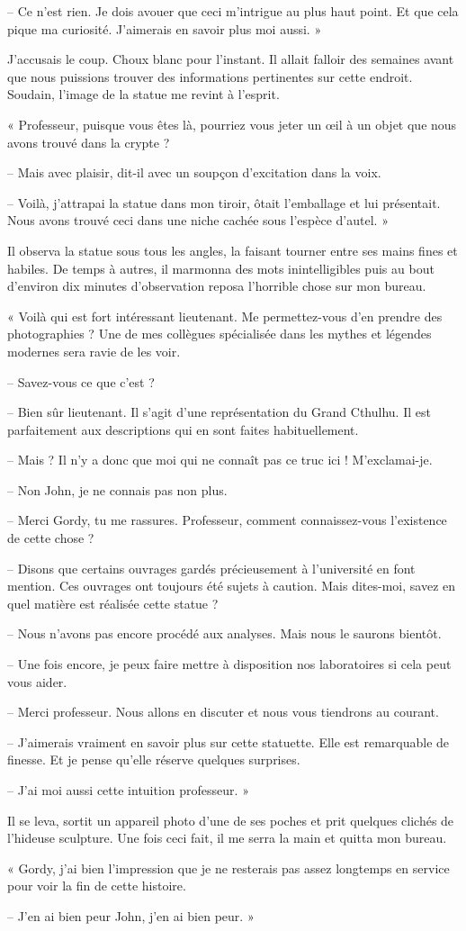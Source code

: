 -- Ce n'est rien. Je dois avouer que ceci m'intrigue au plus haut point. Et que cela pique ma curiosité. J'aimerais en
savoir plus moi aussi. »

J'accusais le coup. Choux blanc pour l'instant. Il allait falloir des semaines avant que nous puissions trouver des
informations pertinentes sur cette endroit. Soudain, l'image de la statue me revint à l'esprit.

« Professeur, puisque vous êtes là, pourriez vous jeter un œil à un objet que nous avons trouvé dans la crypte ?

-- Mais avec plaisir, dit-il avec un soupçon d'excitation dans la voix.

-- Voilà, j'attrapai la statue dans mon tiroir, ôtait l'emballage et lui présentait. Nous avons trouvé ceci dans une
niche cachée sous l'espèce d'autel. »

Il observa la statue sous tous les angles, la faisant tourner entre ses mains fines et habiles. De temps à autres, il
marmonna des mots inintelligibles puis au bout d'environ dix minutes d'observation reposa l'horrible chose sur mon
bureau.

« Voilà qui est fort intéressant lieutenant. Me permettez-vous d'en prendre des photographies ? Une de mes collègues
spécialisée dans les mythes et légendes modernes sera ravie de les voir.

-- Savez-vous ce que c'est ?

-- Bien sûr lieutenant. Il s'agit d'une représentation du Grand Cthulhu. Il est parfaitement aux descriptions qui en
sont faites habituellement.

-- Mais ? Il n'y a donc que moi qui ne connaît pas ce truc ici ! M'exclamai-je.

-- Non John, je ne connais pas non plus.

-- Merci Gordy, tu me rassures. Professeur, comment connaissez-vous l'existence de cette chose ?

-- Disons que certains ouvrages gardés précieusement à l'université en font mention. Ces ouvrages ont toujours été
sujets à caution. Mais dites-moi, savez en quel matière est réalisée cette statue ?

-- Nous n'avons pas encore procédé aux analyses. Mais nous le saurons bientôt.

-- Une fois encore, je peux faire mettre à disposition nos laboratoires si cela peut vous aider.

-- Merci professeur. Nous allons en discuter et nous vous tiendrons au courant.

-- J'aimerais vraiment en savoir plus sur cette statuette. Elle est remarquable de finesse. Et je pense qu'elle réserve
quelques surprises.

-- J'ai moi aussi cette intuition professeur. »

Il se leva, sortit un appareil photo d'une de ses poches et prit quelques clichés de l'hideuse sculpture. Une fois ceci
fait, il me serra la main et quitta mon bureau.

« Gordy, j'ai bien l'impression que je ne resterais pas assez longtemps en service pour voir la fin de cette histoire.

-- J'en ai bien peur John, j'en ai bien peur. »
